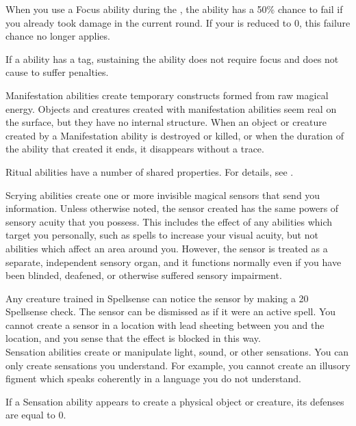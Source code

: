         When you use a Focus ability during the , the ability has a 50\% chance to fail if you already took damage in the current round.
        If your  is reduced to 0, this failure chance no longer applies.

        If a  ability has a  tag, sustaining the ability does not require focus and does not cause to suffer penalties.

         Manifestation abilities create temporary constructs formed from raw magical energy.
        Objects and creatures created with manifestation abilities seem real on the surface, but they have no internal structure.
        When an object or creature created by a Manifestation ability is destroyed or killed, or when the duration of the ability that created it ends, it disappears without a trace.

         Ritual abilities have a number of shared properties.
        For details, see .

         Scrying abilities create one or more invisible magical sensors that send you information.
        Unless otherwise noted, the sensor created has the same powers of sensory acuity that you possess.
        This includes the effect of any abilities which target you personally, such as spells to increase your visual acuity, but not abilities which affect an area around you.
        However, the sensor is treated as a separate, independent sensory organ, and it functions normally even if you have been blinded, deafened, or otherwise suffered sensory impairment.
        \par Any creature trained in Spellsense can notice the sensor by making a  20 Spellsense check.
        The sensor can be dismissed as if it were an active spell.
        You cannot create a sensor in a location with lead sheeting between you and the location, and you sense that the effect is blocked in this way.
        \\

         Sensation abilities create or manipulate light, sound, or other sensations.
        You can only create sensations you understand.
        For example, you cannot create an illusory figment which speaks coherently in a language you do not understand.
        \par If a Sensation ability appears to create a physical object or creature, its defenses are equal to 0.

